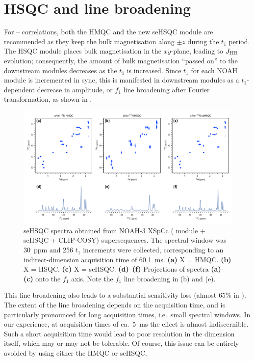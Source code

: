 \section{\texorpdfstring{\nitrogen{}}{15N} HSQC and line broadening}

For \nitrogen{}--\proton{} correlations, both the HMQC and the new seHSQC module are recommended as they keep the bulk magnetisation along $\pm z$ during the $t_1$ period.
The HSQC module places bulk magnetisation in the $xy$-plane, leading to $\jhh$ evolution; consequently, the amount of bulk magnetisation ``passed on'' to the downstream modules decreases as the \nitrogen{} $t_1$ is increased.
Since $t_1$ for each NOAH module is incremented in sync, this is manifested in downstream modules as a $t_1$-dependent decrease in amplitude, or $f_1$ line broadening after Fourier transformation, as shown in .

\begin{figure}
    \centering
    \includegraphics[width=\textwidth]{./figures/n15_linebroadening.png}
    \caption{
        \carbon{} seHSQC spectra obtained from NOAH-3 XSpCc (\nitrogen{} module + \carbon{} seHSQC + CLIP-COSY) supersequences.
        The \nitrogen{} spectral window was \SI{30}{ppm} and 256 $t_1$ increments were collected, corresponding to an indirect-dimension \nitrogen{} acquisition time of \SI{60.1}{\ms}.
        \textbf{(a)} X = HMQC.
        \textbf{(b)} X = HSQC.
        \textbf{(c)} X = seHSQC.
        \textbf{(d)}--\textbf{(f)} Projections of spectra \textbf{(a)}--\textbf{(c)} onto the $f_1$ axis.
        Note the $f_1$ line broadening in (b) and (e).
        \grami{}
    }
    \label{fig:n15_linebroadening}
\end{figure}

This line broadening also leads to a substantial sensitivity loss (almost 65\% in ).
The extent of the line broadening depends on the acquisition time, and is particularly pronounced for long acquisition times, i.e.\ small \nitrogen{} spectral windows.
In our experience, at \nitrogen{} acquisition times of ca.\ \SI{5}{\ms} the effect is almost indiscernible.
Such a short acquisition time would lead to poor resolution in the \nitrogen{} dimension itself, which may or may not be tolerable.
Of course, this issue can be entirely avoided by using either the HMQC or seHSQC.

